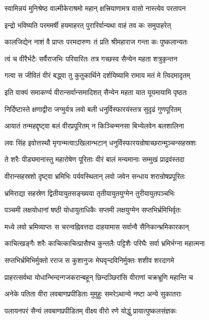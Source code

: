 \twolineshloka
{स्वामिन्नयं मुनिश्रेष्ठ वाल्मीकेराश्रमो महान्}
{क्षत्त्रियाणामत्र वासो नास्त्येव परतापन}%

\twolineshloka
{इन्द्रो भविष्यति परममर्षी हयमाहरत्}
{पुरारिर्वान्यथा वाहं तव कः समुपाहरेत्}%

\twolineshloka
{कालजिद्येन नाशं वै प्राप्तः परमदारुणः}
{तं प्रति श्रीमहाराज गन्ता कः पुष्कलान्यतः}%

\twolineshloka
{त्वं च वीरैर्भटैः सर्वैराजभिः परिवारितः}
{तत्र गच्छस्व सैन्येन महता शत्रुकृन्तन}%

\twolineshloka
{गत्वा स जीवितं वीरं बद्ध्वा तु कुतुकार्थिने}
{दर्शयिष्यामि रामाय मतं मे त्विदमादृतम्}%

\twolineshloka
{इति वाक्यं समाकर्ण्य वीरान्सर्वान्समादिशत्}
{सैन्येन महता यात यूयमायामि पृष्ठतः}%

\twolineshloka
{निर्दिष्टास्ते क्षणाद्वीरा जग्मुर्यत्र लवो बली}
{धनुर्विस्फारयंस्तत्र सुदृढं गुणपूरितम्}%

\twolineshloka
{आयातं तन्महद्दृष्ट्वा बलं वीरप्रपूरितम्}
{न किञ्चिन्मनसा बिभ्येलवेन बलशालिना}%

\twolineshloka
{लवः सिंह इवोत्तस्थौ मृगान्मत्वाऽखिलान्भटान्}
{धनुर्विस्फारयन्रोषाच्छरान्मुञ्चन्सहस्रशः}%

\twolineshloka
{ते शरैः पीड्यमानास्तु महारोषेण पूरिताः}
{वीरं बालं मन्यमानाः सम्मुखं प्राद्रवंस्तदा}%

\twolineshloka
{वीरान्सहस्रशो दृष्ट्वा भ्रमिभिः पर्यवस्थितान्}
{लवो जवेन सन्धाय शरान्रोषप्रपूरितः}%

\twolineshloka
{भ्रमिराद्या सहस्रेण द्वितीयायुतसङ्ख्यया}
{तृतीयायुतयुग्मेन तुरीयायुतपञ्चभिः}%

\twolineshloka
{पञ्चमी लक्षयोधानां षष्ठी योधायुताधिकैः}
{सप्तमी लक्षयुग्मेन सप्तभिर्भ्रमिभिर्वृतः}%

\twolineshloka
{मध्ये लवो भ्रमिव्याप्तः स चरन्वह्निवत्तदा}
{दाहयामास सर्वान्वै सैनिकान्भ्रमिकारकान्}%

\twolineshloka
{काचित्खङ्गैः शरैः काचित्काचित्प्रासैश्च कुन्तलैः}
{पट्टिशैः परिघैः सर्वा भ्रमिर्भग्ना महात्मना}%

\twolineshloka
{सप्तभिर्भ्रमिभिर्मुक्तो रराज स कुशानुजः}
{मेघवृन्दविनिर्मुक्तः शशीव शरदागमे}%

\twolineshloka
{प्राहरत्सर्वथा योधान्भिन्दन्गजकरान्बहून्}
{छिन्दञ्छिरांसि वीराणां चक्रभ्रूणि महान्ति च}%

\twolineshloka
{अनेके पतिता वीरा लवबाणप्रपीडिताः}
{मुमुहुः समरेऽथान्ये नष्टा अन्ये सुकातराः}%

\twolineshloka
{पलायनपरं सैन्यं लवबाणप्रपीडितम्}
{वीक्ष्य वीरो रणे योद्धुं प्रायात्पुष्कलसंज्ञकः}%

